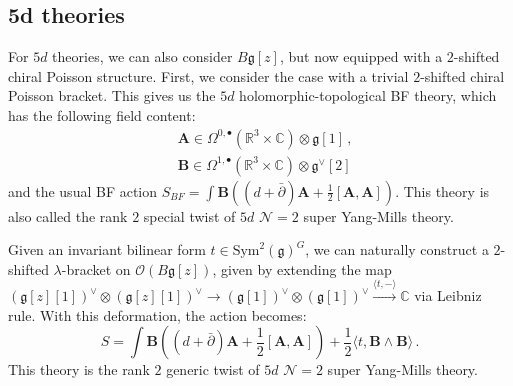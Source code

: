 \documentclass[11pt]{article}
\newcommand{\C}{\mathbb{C}}
\newcommand{\R}{\mathbb{R}}
\numberwithin{equation}{section}
\begin{document}
\subsection{5d theories}

For $5d$ theories, we can also consider $B\mathfrak{g}[z]$, but now equipped with a $2$-shifted chiral Poisson structure. First, we consider the case with a trivial $2$-shifted chiral Poisson bracket. This gives us the $5d$ holomorphic-topological BF theory, which has the following field content:
\begin{equation}
	\begin{aligned}
		&\boldsymbol{A} \in \Omega^{0,\bullet}(\R^3\times\C)\otimes \mathfrak{g}[1]\,,\\
		&\boldsymbol{B} \in \Omega^{1,\bullet}(\R^3\times\C)\otimes \mathfrak{g}^{\vee}[2]
	\end{aligned}
\end{equation}
and the usual BF action $S_{BF} = \int \boldsymbol{B}\left( (d+\bar{\partial})\boldsymbol{A} + \frac{1}{2}[\boldsymbol{A},\boldsymbol{A}]\right)$. This theory is also called the rank $2$ special twist of $5d$ $\mathcal{N} = 2$ super Yang-Mills theory.

Given an invariant bilinear form $t \in \mathrm{Sym}^2(\mathfrak{g})^G$, we can naturally construct a $2$-shifted $\lambda$-bracket on $\mathcal{O}(B\mathfrak{g}[z])$, given by extending the map $(\mathfrak{g}[z][1])^{\vee}\otimes (\mathfrak{g}[z][1])^{\vee} \to (\mathfrak{g}[1])^{\vee}\otimes (\mathfrak{g}[1])^{\vee} \overset{\langle t,-\rangle}{\to} \C$ via Leibniz rule. With this deformation, the action becomes:
\begin{equation}\label{eq:rank2g_5dN2}
	S = \int \boldsymbol{B}\left( (d+\bar{\partial})\boldsymbol{A} + \frac{1}{2}[\boldsymbol{A},\boldsymbol{A}]\right) + \frac{1}{2}\langle t, \boldsymbol{B}\wedge \boldsymbol{B}\rangle\,.
\end{equation}
This theory is the rank $2$ generic twist of $5d$ $\mathcal{N} = 2$ super Yang-Mills theory.
\end{document}
